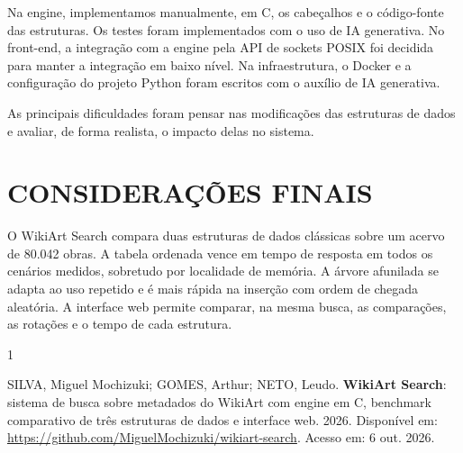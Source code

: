 \documentclass[12pt,a4paper,oneside]{article}
\begin{document}
Na engine, implementamos manualmente, em C, os cabeçalhos e o código-fonte das estruturas. Os testes foram implementados com o uso de IA generativa. No front-end, a integração com a engine pela API de sockets POSIX foi decidida para manter a integração em baixo nível. Na infraestrutura, o Docker e a configuração do projeto Python foram escritos com o auxílio de IA generativa.

As principais dificuldades foram pensar nas modificações das estruturas de dados e avaliar, de forma realista, o impacto delas no sistema.

\section{\textbf{CONSIDERAÇÕES FINAIS}}

O WikiArt Search compara duas estruturas de dados clássicas sobre um acervo de 80.042 obras. A tabela ordenada vence em tempo de resposta em todos os cenários medidos, sobretudo por localidade de memória. A árvore afunilada se adapta ao uso repetido e é mais rápida na inserção com ordem de chegada aleatória. A interface web permite comparar, na mesma busca, as comparações, as rotações e o tempo de cada estrutura.

\clearpage
{}
{}

\begin{thebibliography}{1}

SILVA, Miguel Mochizuki; GOMES, Arthur; NETO, Leudo. \textbf{WikiArt Search}: sistema de busca sobre metadados do WikiArt com engine em C, benchmark comparativo de três estruturas de dados e interface web. 2026. Disponível em: \url{https://github.com/MiguelMochizuki/wikiart-search}. Acesso em: 6 out. 2026.

\end{thebibliography}
\end{document}
